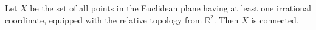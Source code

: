 Let $X$ be the set of all points in the Euclidean plane having at least one irrational coordinate, equipped with the relative topology from $\mathbb{R}^2$. Then $X$ is connected.
